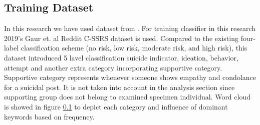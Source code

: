 \documentclass[sn-mathphys,Numbered]{sn-jnl}%
\theoremstyle{thmstyleone}%
\theoremstyle{thmstyletwo}%
\theoremstyle{thmstylethree}%
\begin{document}
\subsection{Training Dataset}
In this research we have used dataset from \cite{gaur2019knowledge}. For training classifier in this research 2019's Gaur et. al \cite{gaur2019knowledge} Reddit C-SSRS dataset is used. Compared to the existing four-label classification scheme (no risk, low risk, moderate risk, and high risk), this dataset introduced 5 lavel classification suicide indicator, ideation, behavior, attempt and another extra category incorporating supportive category. Supportive category represents whenever someone shows empathy and condolance for a suicidal post. It is not taken into account in the analysis section since supporting group does not belong to examined specimen individual. Word cloud is showed in figure \ref{} to depict each category and influence of dominant keywords based on frequency.  
\end{document}
